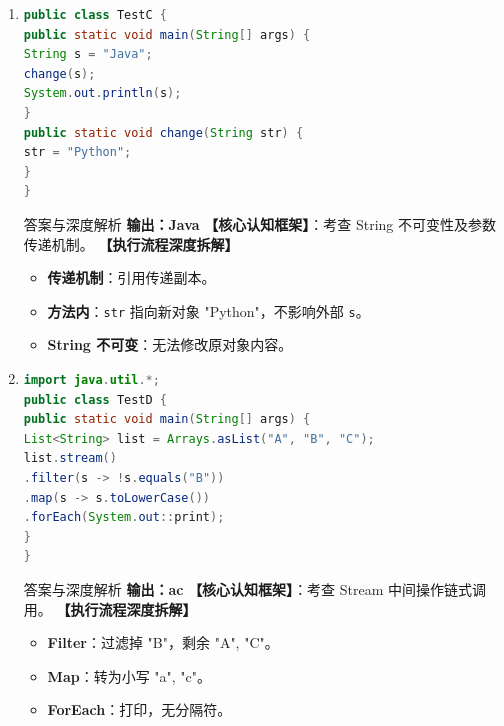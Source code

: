 ﻿\documentclass[12pt, a4paper]{ctexart}
\newcommand{\code}[1]{\texttt{#1}}
\begin{document}
\begin{enumerate}[label=\textbf{\arabic*.}, itemsep=1em]
	\item
	      \begin{lstlisting}[language=Java]
public class TestC {
public static void main(String[] args) {
String s = "Java";
change(s);
System.out.println(s);
}
public static void change(String str) {
str = "Python";
}
}
\end{lstlisting}
	      \begin{bluebox}{答案与深度解析}
		      \textbf{输出：Java}
		      \textbf{【核心认知框架】}：考查 String 不可变性及参数传递机制。
		      \textbf{【执行流程深度拆解】}
		      \begin{itemize}[leftmargin=*, nosep]
			      \item \textbf{传递机制}：引用传递副本。
			      \item \textbf{方法内}：\code{str} 指向新对象 "Python"，不影响外部 \code{s}。
			      \item \textbf{String 不可变}：无法修改原对象内容。
		      \end{itemize}
	      \end{bluebox}

	\item
	      \begin{lstlisting}[language=Java]
import java.util.*;
public class TestD {
public static void main(String[] args) {
List<String> list = Arrays.asList("A", "B", "C");
list.stream()
.filter(s -> !s.equals("B"))
.map(s -> s.toLowerCase())
.forEach(System.out::print);
}
}
\end{lstlisting}
	      \begin{bluebox}{答案与深度解析}
		      \textbf{输出：ac}
		      \textbf{【核心认知框架】}：考查 Stream 中间操作链式调用。
		      \textbf{【执行流程深度拆解】}
		      \begin{itemize}[leftmargin=*, nosep]
			      \item \textbf{Filter}：过滤掉 "B"，剩余 "A", "C"。
			      \item \textbf{Map}：转为小写 "a", "c"。
			      \item \textbf{ForEach}：打印，无分隔符。
		      \end{itemize}
	      \end{bluebox}


\end{enumerate}
\end{document}

